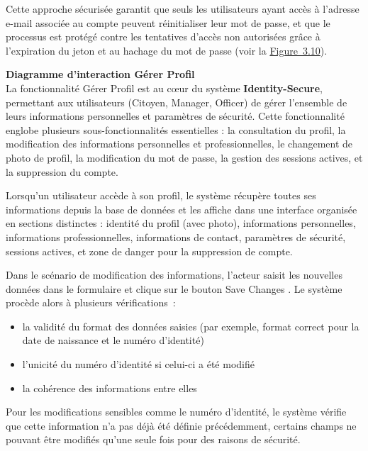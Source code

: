 \hspace{1em}Cette approche sécurisée garantit que seuls les utilisateurs ayant accès à l'adresse e-mail associée au compte peuvent réinitialiser leur mot de passe, et que le processus est protégé contre les tentatives d'accès non autorisées grâce à l'expiration du jeton et au hachage du mot de passe (voir la \hyperref[fig:3.10]{Figure~3.10}).

\medskip

\noindent\textbf{\textendash{} Diagramme d'interaction \og Gérer Profil \fg{}}\\
\hspace{1em}La fonctionnalité \og Gérer Profil \fg{} est au cœur du système \textbf{Identity-Secure}, permettant aux utilisateurs (Citoyen, Manager, Officer) de gérer l'ensemble de leurs informations personnelles et paramètres de sécurité. Cette fonctionnalité englobe plusieurs sous-fonctionnalités essentielles : la consultation du profil, la modification des informations personnelles et professionnelles, le changement de photo de profil, la modification du mot de passe, la gestion des sessions actives, et la suppression du compte.

\hspace{1em}Lorsqu'un utilisateur accède à son profil, le système récupère toutes ses informations depuis la base de données et les affiche dans une interface organisée en sections distinctes : identité du profil (avec photo), informations personnelles, informations professionnelles, informations de contact, paramètres de sécurité, sessions actives, et zone de danger pour la suppression de compte.

\hspace{1em}Dans le scénario de modification des informations, l'acteur saisit les nouvelles données dans le formulaire et clique sur le bouton \og Save Changes \fg{}. Le système procède alors à plusieurs vérifications~:
\begin{itemize}[label=]
    \item la validité du format des données saisies (par exemple, format correct pour la date de naissance et le numéro d'identité)
    \item l'unicité du numéro d'identité si celui-ci a été modifié
    \item la cohérence des informations entre elles
\end{itemize}

\hspace{1em}Pour les modifications sensibles comme le numéro d'identité, le système vérifie que cette information n'a pas déjà été définie précédemment, certains champs ne pouvant être modifiés qu'une seule fois pour des raisons de sécurité.

